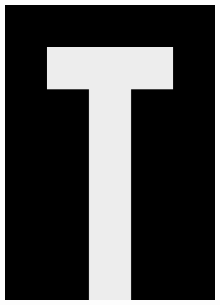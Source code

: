 \documentclass[12pt]{article}
\begin{document}
\begin{figure}[ht]
\centering
\begin{subfigure}[b]{.3\linewidth}
\includegraphics[width=\linewidth]{glyph-T.png}
\label{fig:glyph-T}
\end{subfigure}
\begin{subfigure}[b]{.3\linewidth}

\end{subfigure}
\end{figure}
\end{document}
